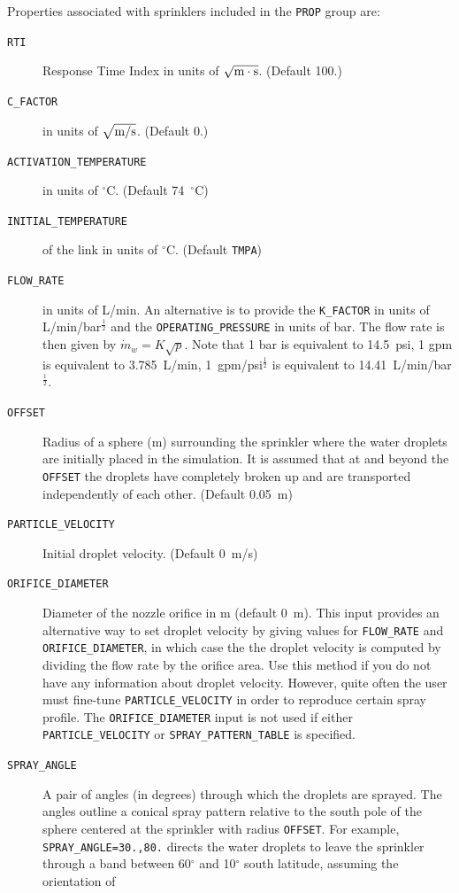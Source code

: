 \documentclass[11pt]{book}
\newcommand{\ct}{\tt\small}
\newcommand{\dm}{\dot{m}}
\newcommand{\ha}{\frac{1}{2}}
\begin{document}
Properties associated with sprinklers included in the {\ct PROP} group are:
\begin{description}
\item[{\ct RTI}] Response Time Index in units of $\sqrt{\hbox{m}\cdot \hbox{s}}$. (Default 100.)
\item[{\ct C\_FACTOR}] in units of $\sqrt{\hbox{m/s}}$. (Default 0.)
\item[{\ct ACTIVATION\_TEMPERATURE}] in units of $^\circ$C. (Default 74~$^\circ$C)
\item[{\ct INITIAL\_TEMPERATURE}] of the link in units of $^\circ$C. (Default {\ct TMPA})
\item[{\ct FLOW\_RATE}] in units of L/min.
An alternative is to provide the {\ct K\_FACTOR} in units of L/min/bar$^\ha$ and the
{\ct OPERATING\_PRESSURE} in units of bar.
The flow rate is then given by $ \dm_w = K \sqrt{p}$. Note that 1 bar is equivalent to
14.5~psi, 1 gpm is equivalent to 3.785~L/min, 1~gpm/psi$^\ha$ is
equivalent to 14.41~L/min/bar$^\ha$.
\item[{\ct OFFSET}] Radius of a sphere (m) surrounding the
sprinkler where the water droplets are initially placed in the simulation. It is assumed that
at and beyond the {\ct OFFSET} the droplets have completely broken
up and are transported independently of each other. (Default 0.05~m)
\item[{\ct PARTICLE\_VELOCITY}]  Initial droplet velocity. (Default 0~m/s)
\item[{\ct ORIFICE\_DIAMETER}] Diameter of the nozzle orifice in m (default 0~m). This input provides an alternative way to set droplet velocity
by giving values for {\ct FLOW\_RATE} and {\ct ORIFICE\_DIAMETER}, in which case the the droplet velocity is computed by dividing the
flow rate by the orifice area. Use this method if you do not have any information about droplet velocity. However, quite often
the user must fine-tune {\ct PARTICLE\_VELOCITY} in order to reproduce certain spray profile.
The {\ct ORIFICE\_DIAMETER} input is not used if either {\ct PARTICLE\_VELOCITY} or {\ct SPRAY\_PATTERN\_TABLE} is specified.
\item[{\ct SPRAY\_ANGLE}] A pair of angles (in degrees) through which the droplets are sprayed.
The angles outline a conical spray pattern relative to the
south pole of the sphere centered at the sprinkler with radius {\ct OFFSET}.
For example, {\ct SPRAY\_ANGLE=30.,80.} directs the water droplets to leave
the sprinkler through a band between 60$^\circ$ and 10$^\circ$ south latitude, assuming the orientation of

\end{description}
\end{document}
